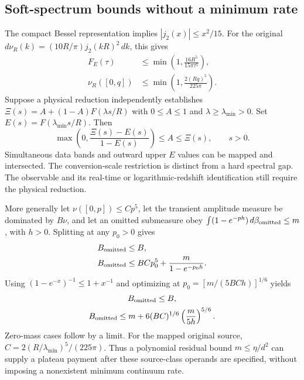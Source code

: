 \subsection{Soft-spectrum bounds without a minimum rate}
\label{subsec:source-soft-spectrum-update}
The compact Bessel representation implies $|j_2(x)|\leq x^2/15$.
For the original $d\nu_R(k)=(10R/\pi)j_2(kR)^2\,dk$, this gives
\begin{align}
 F_E(\tau)&\leq\min\!\left(1,\frac{16R^5}{15\pi\tau^5}\right),\nonumber\\
 \nu_R([0,q])&\leq\min\!\left(1,\frac{2(Rq)^5}{225\pi}\right).
 \label{eq:gapfree-source-bounds-update}
\end{align}
Suppose a physical reduction independently establishes
$\Xi(s)=A+(1-A)F(\lambda s/R)$ with $0\leq A\leq1$ and
$\lambda\geq\lambda_{\min}>0$. Set $E(s)=F(\lambda_{\min}s/R)$. Then
\[
 \max\!\left(0,\frac{\Xi(s)-E(s)}{1-E(s)}\right)
 \leq A\leq\Xi(s),\qquad s>0.
\]
Simultaneous data bands and outward upper $E$ values can be mapped and
intersected. The conversion-scale restriction is distinct from a hard
spectral gap. The observable and its real-time or logarithmic-redshift
identification still require the physical reduction.

More generally let $\nu([0,p])\leq Cp^5$, let the transient amplitude
measure be dominated by $B\nu$, and let an omitted submeasure obey
$\int(1-e^{-ph})\,d\beta_{\rm omitted}\leq m$, with $h>0$.
Splitting at any $p_0>0$ gives
\begin{align*}
 B_{\rm omitted}&\leq B,\\
 B_{\rm omitted}&\leq BCp_0^5+\frac{m}{1-e^{-p_0h}}.
\end{align*}
Using $(1-e^{-x})^{-1}\leq1+x^{-1}$ and optimizing at
$p_0=[m/(5BCh)]^{1/6}$ yields
\begin{equation}
 \begin{gathered}
 B_{\rm omitted}\leq B,\\
 B_{\rm omitted}\leq m+6(BC)^{1/6}
                          \left(\frac{m}{5h}\right)^{5/6}.
 \end{gathered}
 \label{eq:soft-spectrum-payment-update}
\end{equation}
Zero-mass cases follow by a limit. For the mapped original source,
$C=2(R/\lambda_{\min})^5/(225\pi)$. Thus a polynomial residual bound
$m\leq\eta/d^2$ can supply a plateau payment after these source-class
operands are specified, without imposing a nonexistent minimum continuum
rate.

